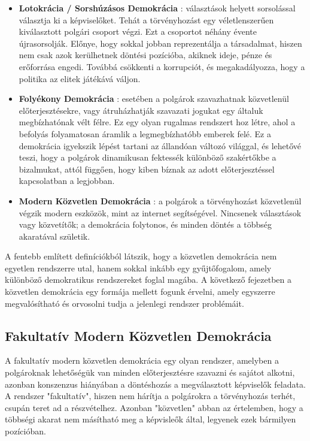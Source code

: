 \begin{itemize}
	\item \textbf{Lotokrácia / Sorshúzásos Demokrácia} \cite{lottery_dem_1, lottery_dem_2, lottery_dem_3}:
	      választások helyett sorsolással választja ki a képviselőket. Tehát a törvényhozást egy véletlenszerűen
	      kiválasztott polgári csoport végzi. Ezt a csoportot néhány évente újrasorsolják. Előnye, hogy sokkal
	      jobban reprezentálja a társadalmat, hiszen nem csak azok kerülhetnek döntési pozícióba, akiknek ideje,
	      pénze és erőforrása engedi. Továbbá csökkenti a korrupciót, és megakadályozza, hogy a politika az
	      elitek játékává váljon.

	\item \textbf{Folyékony Demokrácia} \cite{liquid_dem_1, liquid_dem_2}: esetében a polgárok szavazhatnak
	      közvetlenül előterjesztésekre, vagy átruházhatják szavazati jogukat egy általuk megbízhatónak vélt félre.
	      Ez egy olyan rugalmas rendszert hoz létre, ahol a befolyás folyamatosan áramlik a legmegbízhatóbb emberek
	      felé. Ez a demokrácia igyekszik lépést tartani az állandóan változó világgal, és lehetővé teszi, hogy a
	      polgárok dinamikusan fektessék különböző szakértőkbe a bizalmukat, attól függően, hogy kiben bíznak az
	      adott előterjesztéssel kapcsolatban a legjobban.

	\item \textbf{Modern Közvetlen Demokrácia} \cite{direct_dem_1}: a polgárok a törvényhozást közvetlenül
	      végzik modern eszközök, mint az internet segítségével. Nincsenek választások vagy közvetítők; a demokrácia
	      folytonos, és minden döntés a többség akaratával születik.

\end{itemize}

A fentebb említett definíciókból látszik, hogy a közvetlen demokrácia nem egyetlen rendszerre utal,
hanem sokkal inkább egy gyűjtőfogalom, amely különböző demokratikus rendszereket foglal magába. A
következő fejezetben a közvetlen demokrácia egy formája mellett fogunk érvelni, amely egyszerre
megvalósítható és orvosolni tudja a jelenlegi rendszer problémáit.


\subsection{Fakultatív Modern Közvetlen Demokrácia}

A fakultatív modern közvetlen demokrácia egy olyan rendszer, amelyben a polgároknak lehetőségük van
minden előterjesztésre szavazni és sajátot alkotni, azonban konszenzus hiányában a döntéshozás
a megválasztott képviselők feladata. A rendszer "fakultatív", hiszen nem hárítja a polgárokra
a törvényhozás terhét, csupán teret ad a részvételhez. Azonban "közvetlen" abban az értelemben,
hogy a többségi akarat nem másítható meg a képvisleők által, legyenek ezek bármilyen pozícióban.

